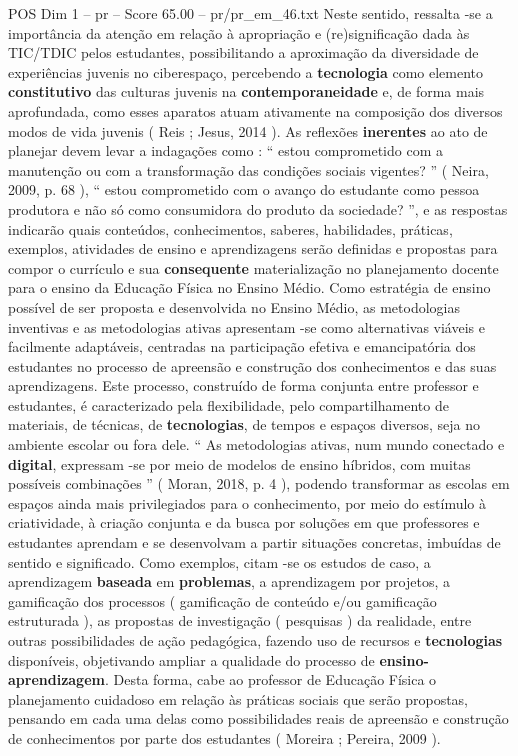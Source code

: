 \begin{textsample}{POS Dim 1 – pr – Score 65.00 – pr/pr\_em\_46.txt}
Neste sentido, ressalta -se a importância da atenção em relação à apropriação e (re)significação dada às TIC/TDIC pelos estudantes, possibilitando a aproximação da diversidade de experiências juvenis no ciberespaço, percebendo a \textbf{tecnologia} como elemento \textbf{constitutivo} das culturas juvenis na \textbf{contemporaneidade} e, de forma mais aprofundada, como esses aparatos atuam ativamente na composição dos diversos modos de vida juvenis ( Reis ; Jesus, 2014 ).
As reflexões \textbf{inerentes} ao ato de planejar devem levar a indagações como : “ estou comprometido com a manutenção ou com a transformação das condições sociais vigentes? ” ( Neira, 2009, p. 68 ), “ estou comprometido com o avanço do estudante como pessoa produtora e não só como consumidora do produto da sociedade? ”, e as respostas indicarão quais conteúdos, conhecimentos, saberes, habilidades, práticas, exemplos, atividades de ensino e aprendizagens serão definidas e propostas para compor o currículo e sua \textbf{consequente} materialização no planejamento docente para o ensino da Educação Física no Ensino Médio.
Como estratégia de ensino possível de ser proposta e desenvolvida no Ensino Médio, as metodologias inventivas e as metodologias ativas apresentam -se como alternativas viáveis e facilmente adaptáveis, centradas na participação efetiva e emancipatória dos estudantes no processo de apreensão e construção dos conhecimentos e das suas aprendizagens.
Este processo, construído de forma conjunta entre professor e estudantes, é caracterizado pela flexibilidade, pelo compartilhamento de materiais, de técnicas, de \textbf{tecnologias}, de tempos e espaços diversos, seja no ambiente escolar ou fora dele. “ As metodologias ativas, num mundo conectado e \textbf{digital}, expressam -se por meio de modelos de ensino híbridos, com muitas possíveis combinações ” ( Moran, 2018, p. 4 ), podendo transformar as escolas em espaços ainda mais privilegiados para o conhecimento, por meio do estímulo à criatividade, à criação conjunta e da busca por soluções em que professores e estudantes aprendam e se desenvolvam a partir situações concretas, imbuídas de sentido e significado.
Como exemplos, citam -se os estudos de caso, a aprendizagem \textbf{baseada} em \textbf{problemas}, a aprendizagem por projetos, a gamificação dos processos ( gamificação de conteúdo e/ou gamificação estruturada ), as propostas de investigação ( pesquisas ) da realidade, entre outras possibilidades de ação pedagógica, fazendo uso de recursos e \textbf{tecnologias} disponíveis, objetivando ampliar a qualidade do processo de \textbf{ensino-aprendizagem}.
Desta forma, cabe ao professor de Educação Física o planejamento cuidadoso em relação às práticas sociais que serão propostas, pensando em cada uma delas como possibilidades reais de apreensão e construção de conhecimentos por parte dos estudantes ( Moreira ; Pereira, 2009 ).


\end{textsample}

